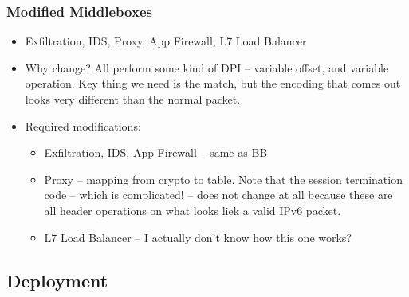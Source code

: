 \subsubsection{Modified Middleboxes}
\begin{itemize}
  \item Exfiltration, IDS, Proxy, App Firewall, L7 Load Balancer
  \item Why change? All perform some kind of DPI -- variable offset, and variable operation. Key thing we need is the match, but the encoding that comes out looks very different than the normal packet.
  \item Required modifications:
    \begin{itemize}
      \item Exfiltration, IDS, App Firewall -- same as BB
      \item Proxy -- mapping from crypto to table. Note that the session termination code -- which is complicated! -- does not change at all because these are all header operations on what looks liek a valid IPv6 packet.
      \item L7 Load Balancer -- I actually don't know how this one works?
    \end{itemize}
\end{itemize}

\subsection{Deployment}
\label{sec:deployment}
